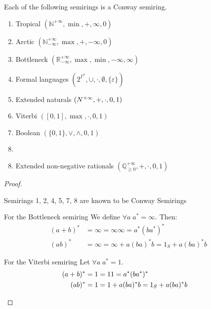 \documentclass[a4paper,UKenglish,cleveref, autoref, thm-restate]{lipics-v2021}
\newcommand{\exN}{\mathbb{N}^{+\infty}}
\newcommand{\exQp}{\mathbb{Q}_{\geq0}^{+\infty}}
\theoremstyle{plain}\newtheoremrep{thm}{Theorem}[section]
\begin{document}
\begin{toappendix}
		\begin{lem}
			Each of the following semirings is a Conway semiring. \label{conawysemis}
			\begin{multicols}{2}
				\begin{enumerate}[nosep]
					\item Tropical $(\exN, \min, +, \infty, 0)$
					\item Arctic  $(\mathbb N^{+\infty}_{-\infty}, \max, +, -\infty, 0)$
					\item Bottleneck  $(\mathbb R^{+\infty}_{-\infty}, \max, \min, -\infty, \infty)$
					\item Formal languages  $(2^{\Gamma^*}, \cup, \cdot, \emptyset, \{\varepsilon\})$
					\item Extended naturals  $(\mathbb \exN, +, \cdot, 0, 1)$
					\item Viterbi  $([0,1], \max, \cdot, 0, 1)$
					\item Boolean  $(\{0,1\}, \lor, \land, 0, 1)$
					\item[]
				\end{enumerate}
			\end{multicols}
			\begin{enumerate}[nosep]
				\setcounter{enumi}{7}
				\item Extended non-negative rationals $(\exQp, +, \cdot, 0, 1)$
			\end{enumerate}
		\end{lem}
		\begin{proof}
			\begin{enumerate}
				Semirings 1, 2, 4, 5, 7, 8 are known to be Conway Semirings \cite[p. 8]{weightedhandbook}
	
	
				For the Bottleneck semiring
				We define $\forall a \; a^* = \infty$. Then: 
				\begin{align*}
					(a+b)^* &= \infty = \infty\infty = a^*(ba^*)^*\\
					(ab)^* &= \infty = \infty+a(ba)^*b = 1_S+a(ba)^*b
				\end{align*}
				
				
				For the Viterbi semiring
				Let $\forall a\; a^* = 1$.
				\begin{align*}
					 (a+b)^* &= 1 = 11 = a^*(ba^*)^*\\
					 (ab)^* &= 1 = 1+a(ba)^*b = 1_S+a(ba)^*b&\rlap{\qedhere} 
				\end{align*}
			\end{enumerate}
		\end{proof}
	\end{toappendix}
\end{document}
